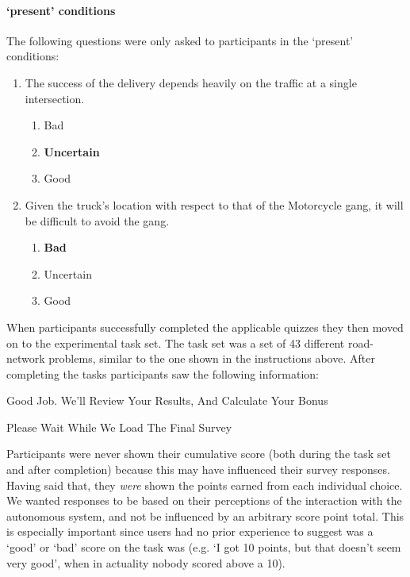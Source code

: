 \paragraph{\xO{} `present' conditions} The following questions were only asked to participants in the \xO{} `present' conditions:
\begin{quoting}
\begin{enumerate}
    \item The success of the delivery depends heavily on the traffic at a single intersection.
    \begin{enumerate}[label=(\alph*)]
        \item Bad
        \item \textbf{Uncertain}
        \item Good
    \end{enumerate}
    \item Given the truck’s location with respect to that of the Motorcycle gang, it will be difficult to avoid the gang.
    \begin{enumerate}[label=(\alph*)]
        \item \textbf{Bad}
        \item Uncertain
        \item Good
    \end{enumerate}
\end{enumerate}
\end{quoting}

When participants successfully completed the applicable quizzes they then moved on to the experimental task set. The task set was a set of 43 different road-network problems, similar to the one shown in the instructions above. After completing the tasks participants saw the following information:

\begin{quoting}
    Good Job. We'll Review Your Results, And Calculate Your Bonus

    Please Wait While We Load The Final Survey
\end{quoting}

Participants were never shown their cumulative score (both during the task set and after completion) because this may have influenced their survey responses. Having said that, they \emph{were} shown the points earned from each individual choice. We wanted responses to be based on their perceptions of the interaction with the autonomous system, and not be influenced by an arbitrary score point total. This is especially important since users had no prior experience to suggest was a `good' or `bad' score on the task was (e.g. `I got 10 points, but that doesn't seem very good', when in actuality nobody scored above a 10).

